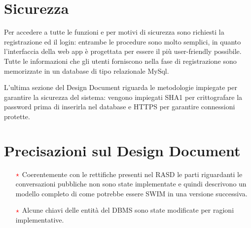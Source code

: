 \section{Sicurezza}

Per accedere a tutte le funzioni e per motivi di sicurezza sono richiesti la registrazione ed il login: entrambe le procedure sono molto semplici, in quanto l'interfaccia della web app è progettata per essere il più
user-friendly possibile. Tutte le informazioni che gli utenti forniscono nella fase di registrazione sono memorizzate in un database di tipo relazionale MySql.

L'ultima sezione del Design Document riguarda le metodologie impiegate per garantire la sicurezza del sistema: vengono impiegati SHA1 per crittografare la password prima di inserirla nel database e HTTPS per garantire connessioni protette.

\section{Precisazioni sul Design Document}
\begin{itemize}
\item [$\textcolor{red}{\star}$]Coerentemente con le rettifiche presenti nel RASD le parti riguardanti le conversazioni pubbliche non sono state implementate e quindi descrivono un modello completo di come potrebbe essere SWIM in una versione successiva.

\item[$\textcolor{red}{\star}$]Alcune chiavi delle entità del DBMS sono state modificate per ragioni implementative.
\end{itemize}